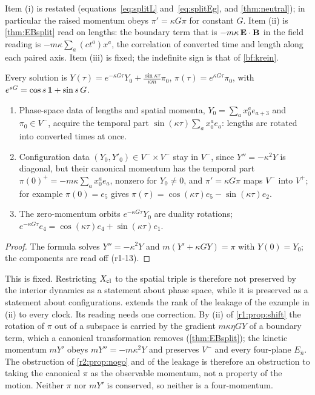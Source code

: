 Item (i) is restated (equations~\eqref{eq:splitL} and~\eqref{eq:splitEg}, and \cref{thm:neutral}); in particular the
raised momentum obeys $\pi'=\kappa G\pi$ for constant $G$. Item (ii) is \cref{thm:EBsplit} read on lengths: the
boundary term that is $-m\kappa\,\mathbf E\cdot\mathbf B$ in the field reading is $-m\kappa\sum_a(ct^a)x^a$, the correlation of converted time and
length along each paired axis. Item (iii) is fixed; the indefinite sign is that of \cref{bf:krein}.

\begin{proposition}
\label{r1:prop:mix}
Every solution is $Y(\tau)=e^{-\kappa G\tau}Y_0+\frac{\sin\kappa\tau}{\kappa m}\pi_0$, $\pi(\tau)=e^{\kappa G\tau}\pi_0$, with
$e^{sG}=\cos s\,\mathbf 1+\sin s\,G$.
\begin{enumerate}[label=(\roman*),leftmargin=2.2em]
\item Phase-space data of lengths and spatial momenta, $Y_0=\sum_ax_0^ae_{a+3}$ and $\pi_0\in V^-$, acquire the temporal part
$\sin(\kappa\tau)\sum_ax_0^ae_a$: lengths are rotated into converted times at once.
\item Configuration data $(Y_0,Y'_0)\in V^-\times V^-$ stay in $V^-$, since $Y''=-\kappa^2Y$ is diagonal, but their canonical momentum
has the temporal part $\pi(0)^+=-m\kappa\sum_ax^a_0e_a$, nonzero for $Y_0\neq0$, and $\pi'=\kappa G\pi$ maps $V^-$ into $V^+$; for example
$\pi(0)=e_5$ gives
$\pi(\tau)=\cos(\kappa\tau)e_5-\sin(\kappa\tau)e_2$.
\item The zero-momentum orbits $e^{-\kappa G\tau}Y_0$ are duality rotations; $e^{-\kappa G\tau}e_4=\cos(\kappa\tau)e_4+\sin(\kappa\tau)e_1$.
\end{enumerate}
\end{proposition}

\begin{proof}
The formula solves $Y''=-\kappa^2Y$ and $m(Y'+\kappa GY)=\pi$ with $Y(0)=Y_0$; the components are read off (r1-13).
\end{proof}

This is fixed. Restricting $X_{\rm cl}$ to the spatial triple is therefore not preserved by the interior dynamics as a statement about phase
space, while it is preserved as a statement about configurations.  extends the rank of the leakage of the example in (ii) to every clock. Its reading needs one correction. By (ii) of \cref{r1:prop:shift} the rotation of $\pi$ out of a subspace
is carried by the gradient $m\kappa\eta GY$ of a boundary term, which a canonical transformation removes (\cref{thm:EBsplit}); the
kinetic momentum $mY'$ obeys $mY''=-m\kappa^2Y$ and preserves $V^-$ and every four-plane $E_{\hat n}$. The obstruction of \cref{r2:prop:nogo} and of the leakage is therefore an obstruction to taking the canonical $\pi$ as the observable momentum, not a property of the
motion. Neither $\pi$ nor $mY'$ is conserved, so neither is a four-momentum.

